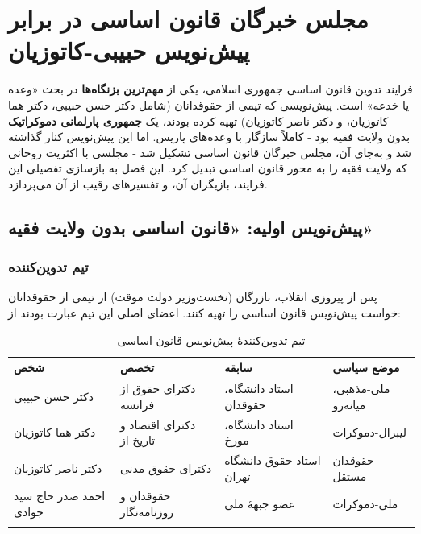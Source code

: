 \documentclass[12pt,a4paper]{book}
\newcommand{\keyword}[1]{\textbf{\textcolor{cPrimary}{#1}}}
\newcommand{\en}[1]{\lr{\textit{#1}}}
\begin{document}
\chapter{مجلس خبرگان قانون اساسی در برابر پیش‌نویس حبیبی-کاتوزیان}
\label{chap:20c248}


\begin{infoBox}
فرایند تدوین قانون اساسی جمهوری اسلامی، یکی از \keyword{مهم‌ترین بزنگاه‌ها} در بحث «وعده یا خدعه» است. پیش‌نویسی که تیمی از حقوقدانان (شامل دکتر حسن حبیبی، دکتر هما کاتوزیان، و دکتر ناصر کاتوزیان) تهیه کرده بودند، یک \keyword{جمهوری پارلمانی دموکراتیک} بدون ولایت فقیه بود - کاملاً سازگار با وعده‌های پاریس. اما این پیش‌نویس کنار گذاشته شد و به‌جای آن، مجلس خبرگان قانون اساسی تشکیل شد - مجلسی با اکثریت روحانی که ولایت فقیه را به محور قانون اساسی تبدیل کرد. این فصل به بازسازی تفصیلی این فرایند، بازیگران آن، و تفسیرهای رقیب از آن می‌پردازد.
\end{infoBox}

\section{پیش‌نویس اولیه: «قانون اساسی بدون ولایت فقیه»}

\subsection{تیم تدوین‌کننده}

پس از پیروزی انقلاب، بازرگان (نخست‌وزیر دولت موقت) از تیمی از حقوقدانان خواست پیش‌نویس قانون اساسی را تهیه کنند. اعضای اصلی این تیم عبارت بودند از:

\begin{longtable}{%
    >{\raggedleft\arraybackslash}p{}
    >{\raggedleft\arraybackslash}p{}
    >{\raggedleft\arraybackslash}p{}
    >{\raggedleft\arraybackslash}p{}}
\toprule
\rowcolor{cPrimary!10}
\textbf{شخص} & \textbf{تخصص} & \textbf{سابقه} & \textbf{موضع سیاسی} \\
\midrule
\endhead

دکتر حسن حبیبی &
دکترای حقوق از فرانسه &
استاد دانشگاه، حقوقدان &
ملی-مذهبی، میانه‌رو \\
\midrule

دکتر هما کاتوزیان &
دکترای اقتصاد و تاریخ از \en{Oxford} &
استاد دانشگاه، مورخ &
لیبرال-دموکرات \\
\midrule

دکتر ناصر کاتوزیان &
دکترای حقوق مدنی &
استاد حقوق دانشگاه تهران &
حقوقدان مستقل \\
\midrule

احمد صدر حاج سید جوادی &
حقوقدان و روزنامه‌نگار &
عضو جبههٔ ملی &
ملی-دموکرات \\

\bottomrule
\caption{تیم تدوین‌کنندهٔ پیش‌نویس قانون اساسی}
\label{tab:draft-team}
\end{longtable}
\end{document}

